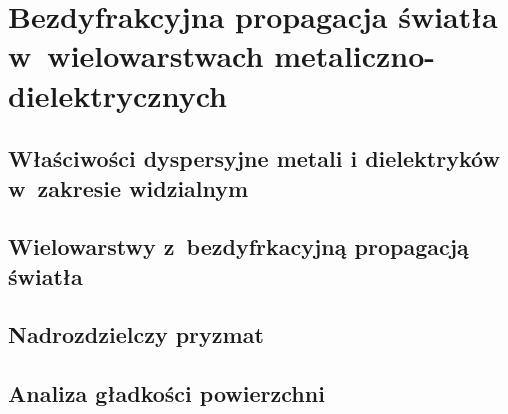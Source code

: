 \chapter{\mbox{Bezdyfrakcyjna} \mbox{propagacja} \mbox{światła} \mbox{w~wielowarstwach} \mbox{metaliczno-dielektrycznych}}
\label{art:nondiff}

\section{Właściwości dyspersyjne metali i dielektryków w~zakresie widzialnym}

\section{Wielowarstwy z~bezdyfrkacyjną propagacją światła}

\section{Nadrozdzielczy pryzmat}


\section{Analiza gładkości powierzchni}



